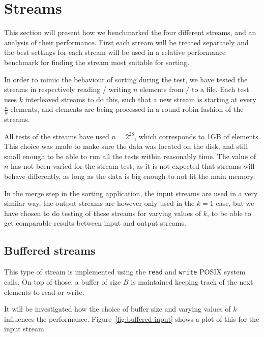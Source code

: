 \documentclass[a4paper,12pt]{article}
\begin{document}
\section{Streams}
This section will present how we benchmarked the four different
streams, and an analysis of their performance. First each stream will
be treated separately and the best settings for each stream will be
used in a relative performance benchmark for finding the stream most
suitable for sorting.

In order to mimic the behaviour of sorting during the test, we have
tested the streams in respectively reading / writing $n$ elements from
/ to a file. Each test uses $k$ interleaved streams to do this, such
that a new stream is starting at every $\frac{n}{k}$ elements, and
elements are being processed in a round robin fashion of the streams.

All tests of the streams have used $n = 2^{28}$, which corresponds to
1GB of elements. This choice was made to make sure the data was
located on the disk, and still small enough to be able to run all the tests within reasonably time. The
value of $n$ has not been varied for the stream test, as it is not
expected that streams will behave differently, as long as the data is
big enough to not fit the main memory.

In the merge step in the sorting application, the input streams are
used in a very similar way, the output streams are however only used
in the $k = 1$ case, but we have chosen to do testing of these streams
for varying values of $k$, to be able to get comparable results
between input and output streams.

\subsection{Buffered streams}
\label{sec:buffered-streams}
This type of stream is implemented using the \texttt{read} and
\texttt{write} POSIX system calls. On top of those, a buffer of size
$B$ is maintained keeping track of the next elements to read or write.

It will be investigated how the choice of buffer size and varying
values of $k$ influences the
performance. Figure~\ref{fig:buffered-input} shows a plot of this for
the input stream.
\end{document}
